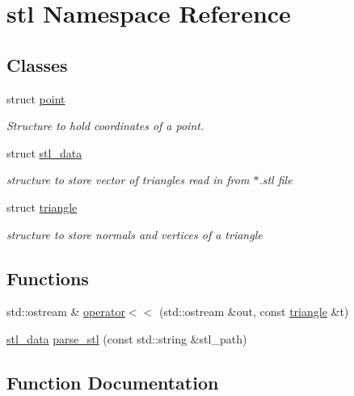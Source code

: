 \hypertarget{namespacestl}{}\section{stl Namespace Reference}
\label{namespacestl}
\subsection*{Classes}
\begin{DoxyCompactItemize}
\item 
struct \mbox{\hyperlink{structstl_1_1point}{point}}
\begin{DoxyCompactList}\small\item\em Structure to hold coordinates of a point. \end{DoxyCompactList}\item 
struct \mbox{\hyperlink{structstl_1_1stl__data}{stl\+\_\+data}}
\begin{DoxyCompactList}\small\item\em structure to store vector of triangles read in from $\ast$.stl file \end{DoxyCompactList}\item 
struct \mbox{\hyperlink{structstl_1_1triangle}{triangle}}
\begin{DoxyCompactList}\small\item\em structure to store normals and vertices of a triangle \end{DoxyCompactList}\end{DoxyCompactItemize}
\subsection*{Functions}
\begin{DoxyCompactItemize}
\item 
std\+::ostream \& \mbox{\hyperlink{namespacestl_ae4582d172b238234aa86690bb28044e9}{operator$<$$<$}} (std\+::ostream \&out, const \mbox{\hyperlink{structstl_1_1triangle}{triangle}} \&t)
\item 
\mbox{\hyperlink{structstl_1_1stl__data}{stl\+\_\+data}} \mbox{\hyperlink{namespacestl_ad322d44b1c95c5975c33f9a5abe8df9d}{parse\+\_\+stl}} (const std\+::string \&stl\+\_\+path)
\end{DoxyCompactItemize}


\subsection{Function Documentation}
\mbox{\label{namespacestl_ae4582d172b238234aa86690bb28044e9}} 
